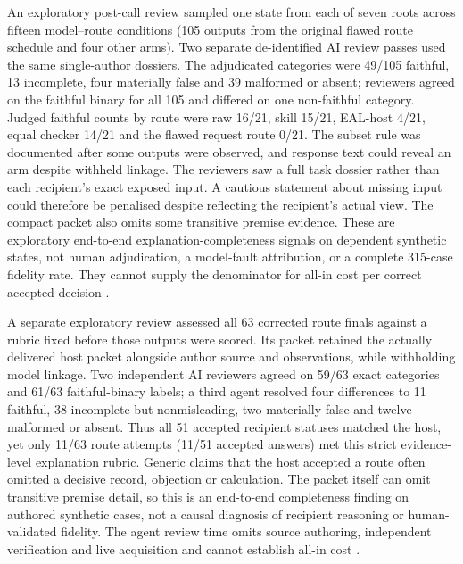 \documentclass[preprint,12pt]{elsarticle}
\begin{document}
An exploratory post-call review sampled one state from each of seven roots across fifteen model--route conditions (105 outputs from the original flawed route schedule and four other arms). Two separate de-identified AI review passes used the same single-author dossiers. The adjudicated categories were 49/105 faithful, 13 incomplete, four materially false and 39 malformed or absent; reviewers agreed on the faithful binary for all 105 and differed on one non-faithful category. Judged faithful counts by route were raw 16/21, skill 15/21, EAL-host 4/21, equal checker 14/21 and the flawed request route 0/21. The subset rule was documented after some outputs were observed, and response text could reveal an arm despite withheld linkage. The reviewers saw a full task dossier rather than each recipient's exact exposed input. A cautious statement about missing input could therefore be penalised despite reflecting the recipient's actual view. The compact packet also omits some transitive premise evidence. These are exploratory end-to-end explanation-completeness signals on dependent synthetic states, not human adjudication, a model-fault attribution, or a complete 315-case fidelity rate. They cannot supply the denominator for all-in cost per correct accepted decision \citep{earlExplanationReview}.

A separate exploratory review assessed all 63 corrected route finals against a rubric fixed before those outputs were scored. Its packet retained the actually delivered host packet alongside author source and observations, while withholding model linkage. Two independent AI reviewers agreed on 59/63 exact categories and 61/63 faithful-binary labels; a third agent resolved four differences to 11 faithful, 38 incomplete but nonmisleading, two materially false and twelve malformed or absent. Thus all 51 accepted recipient statuses matched the host, yet only 11/63 route attempts (11/51 accepted answers) met this strict evidence-level explanation rubric. Generic claims that the host accepted a route often omitted a decisive record, objection or calculation. The packet itself can omit transitive premise detail, so this is an end-to-end completeness finding on authored synthetic cases, not a causal diagnosis of recipient reasoning or human-validated fidelity. The agent review time omits source authoring, independent verification and live acquisition and cannot establish all-in cost \citep{earlRouteV2Explanation}.
\end{document}
